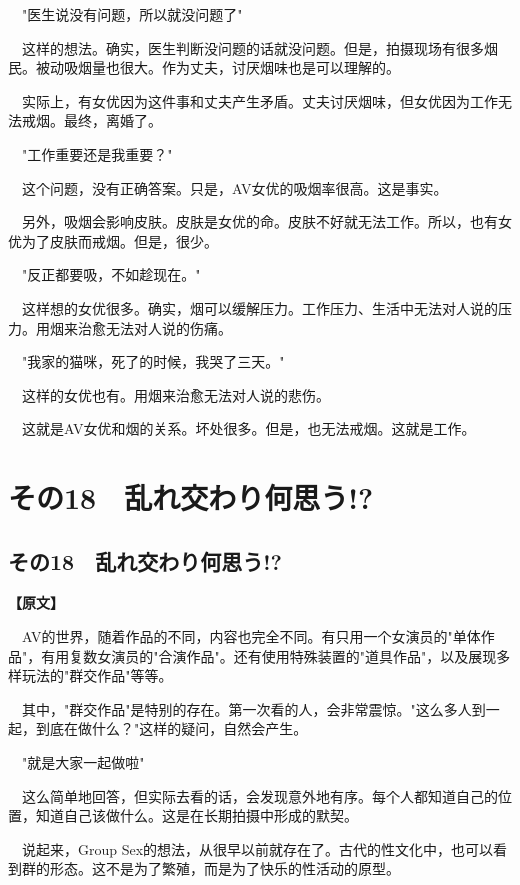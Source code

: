 \documentclass[12pt,UTF8]{ctexbook}
\begin{document}
{{　"医生说没有问题，所以就没问题了"

　这样的想法。确实，医生判断没问题的话就没问题。但是，拍摄现场有很多烟民。被动吸烟量也很大。作为丈夫，讨厌烟味也是可以理解的。

　实际上，有女优因为这件事和丈夫产生矛盾。丈夫讨厌烟味，但女优因为工作无法戒烟。最终，离婚了。

　"工作重要还是我重要？"

　这个问题，没有正确答案。只是，AV女优的吸烟率很高。这是事实。

　另外，吸烟会影响皮肤。皮肤是女优的命。皮肤不好就无法工作。所以，也有女优为了皮肤而戒烟。但是，很少。

　"反正都要吸，不如趁现在。"

　这样想的女优很多。确实，烟可以缓解压力。工作压力、生活中无法对人说的压力。用烟来治愈无法对人说的伤痛。

　"我家的猫咪，死了的时候，我哭了三天。"

　这样的女优也有。用烟来治愈无法对人说的悲伤。

　这就是AV女优和烟的关系。坏处很多。但是，也无法戒烟。这就是工作。
}

\chapter{その18　乱れ交わり何思う!?}
\label{chap:18}

\section{その18　乱れ交わり何思う!?}

\vspace{1ex}
\parbox{0.9\linewidth}{
\textbf{【原文】}\par

　AV的世界，随着作品的不同，内容也完全不同。有只用一个女演员的"单体作品"，有用复数女演员的"合演作品"。还有使用特殊装置的"道具作品"，以及展现多样玩法的"群交作品"等等。

　其中，"群交作品"是特别的存在。第一次看的人，会非常震惊。"这么多人到一起，到底在做什么？"这样的疑问，自然会产生。

　"就是大家一起做啦"

　这么简单地回答，但实际去看的话，会发现意外地有序。每个人都知道自己的位置，知道自己该做什么。这是在长期拍摄中形成的默契。

　说起来，Group Sex的想法，从很早以前就存在了。古代的性文化中，也可以看到群的形态。这不是为了繁殖，而是为了快乐的性活动的原型。

}}
\end{document}
